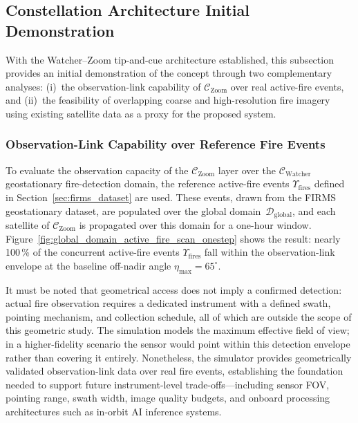 

\subsection{Constellation Architecture Initial Demonstration}
\label{sec:constellation_architecture_initial_demonstration}

With the Watcher--Zoom tip-and-cue architecture established, this subsection provides an initial demonstration of the concept through two complementary analyses: (i)~the observation-link capability of $\mathcal{C}_{\text{Zoom}}$ over real active-fire events, and (ii)~the feasibility of overlapping coarse and high-resolution fire imagery using existing satellite data as a proxy for the proposed system.

\subsubsection{Observation-Link Capability over Reference Fire Events}
\label{sec:concept_initial_observation_link_capability}

To evaluate the observation capacity of the $\mathcal{C}_{\text{Zoom}}$ layer over the $\mathcal{C}_{\text{Watcher}}$ geostationary fire-detection domain, the reference active-fire events $\Upsilon_{\text{fires}}$ defined in Section~\ref{sec:firms_dataset} are used.  These events, drawn from the FIRMS geostationary dataset, are populated over the global domain~$\mathcal{D}_{\text{global}}$, and each satellite of $\mathcal{C}_{\text{Zoom}}$ is propagated over this domain for a one-hour window.  Figure~\ref{fig:global_domain_active_fire_scan_onestep} shows the result: nearly 100\,\% of the concurrent active-fire events $\Upsilon_{\text{fires}}$ fall within the observation-link envelope at the baseline off-nadir angle $\eta_{\max} = 65^{\circ}$.

It must be noted that geometrical access does not imply a confirmed detection: actual fire observation requires a dedicated instrument with a defined swath, pointing mechanism, and collection schedule, all of which are outside the scope of this geometric study.  The simulation models the maximum effective field of view; in a higher-fidelity scenario the sensor would point within this detection envelope rather than covering it entirely.  Nonetheless, the simulator provides geometrically validated observation-link data over real fire events, establishing the foundation needed to support future instrument-level trade-offs---including sensor FOV, pointing range, swath width, image quality budgets, and onboard processing architectures such as in-orbit AI inference systems.

